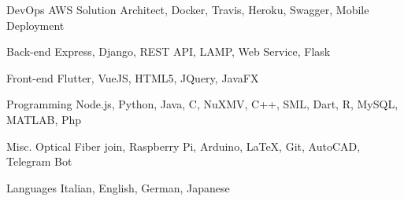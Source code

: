 

\begin{cvskills}

  \cvskill
    {DevOps} %
    {AWS Solution Architect, Docker, Travis, Heroku, Swagger, Mobile Deployment} %

  \cvskill
    {Back-end} %
    {Express, Django, REST API, LAMP, Web Service, Flask} %

  \cvskill
    {Front-end} %
    {Flutter, VueJS, HTML5, JQuery, JavaFX} %

  \cvskill
    {Programming} %
    {Node.js, Python, Java, C, NuXMV, C++, SML, Dart, R, MySQL, MATLAB, Php} %

  \cvskill
  {Misc.} %
  {Optical Fiber join, Raspberry Pi, Arduino, LaTeX, Git, AutoCAD, Telegram Bot} %

  \cvskill
    {Languages} %
    {Italian, English, German, Japanese} %

\end{cvskills}
